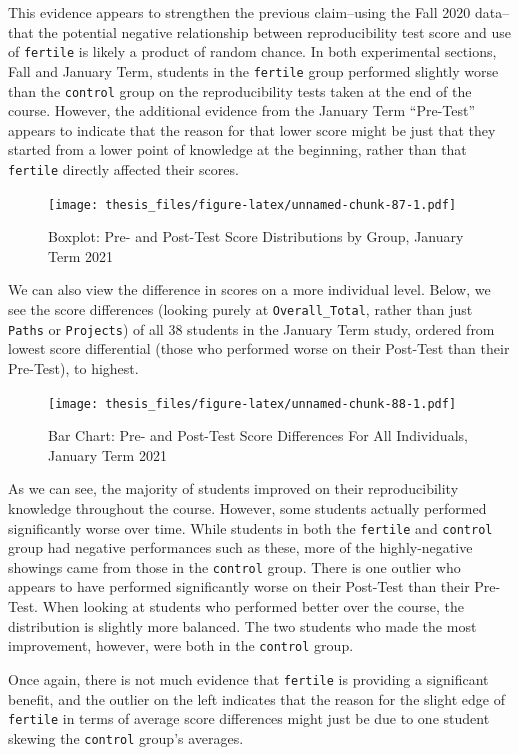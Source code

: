 \documentclass[12pt,twoside]{reedthesis}
\begin{document}
This evidence appears to strengthen the previous claim--using the Fall 2020 data--that the potential negative relationship between reproducibility test score and use of \texttt{fertile} is likely a product of random chance. In both experimental sections, Fall and January Term, students in the \texttt{fertile} group performed slightly worse than the \texttt{control} group on the reproducibility tests taken at the end of the course. However, the additional evidence from the January Term ``Pre-Test'' appears to indicate that the reason for that lower score might be just that they started from a lower point of knowledge at the beginning, rather than that \texttt{fertile} directly affected their scores.
\begin{figure}
\centering
\texttt{[image: thesis\_files/figure-latex/unnamed-chunk-87-1.pdf]}
\caption{\label{fig:unnamed-chunk-87}Boxplot: Pre- and Post-Test Score Distributions by Group, January Term 2021}
\end{figure}
We can also view the difference in scores on a more individual level. Below, we see the score differences (looking purely at \texttt{Overall\_Total}, rather than just \texttt{Paths} or \texttt{Projects}) of all 38 students in the January Term study, ordered from lowest score differential (those who performed worse on their Post-Test than their Pre-Test), to highest.
\begin{figure}
\centering
\texttt{[image: thesis\_files/figure-latex/unnamed-chunk-88-1.pdf]}
\caption{\label{fig:unnamed-chunk-88}Bar Chart: Pre- and Post-Test Score Differences For All Individuals, January Term 2021}
\end{figure}
As we can see, the majority of students improved on their reproducibility knowledge throughout the course. However, some students actually performed significantly worse over time. While students in both the \texttt{fertile} and \texttt{control} group had negative performances such as these, more of the highly-negative showings came from those in the \texttt{control} group. There is one outlier who appears to have performed significantly worse on their Post-Test than their Pre-Test. When looking at students who performed better over the course, the distribution is slightly more balanced. The two students who made the most improvement, however, were both in the \texttt{control} group.

Once again, there is not much evidence that \texttt{fertile} is providing a significant benefit, and the outlier on the left indicates that the reason for the slight edge of \texttt{fertile} in terms of average score differences might just be due to one student skewing the \texttt{control} group's averages.
\end{document}
